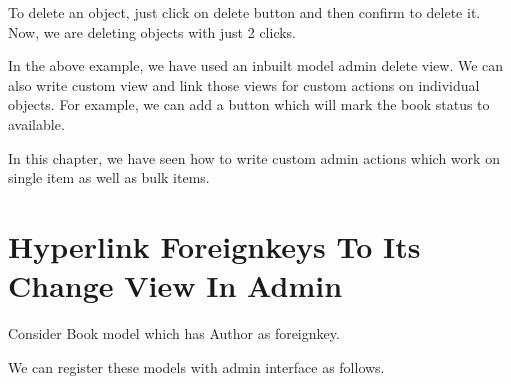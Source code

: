 \documentclass[letterpaper,12pt,english]{sphinxmanual}
\begin{document}
To delete an object, just click on delete button and then confirm to delete it. Now, we are deleting objects with just 2 clicks.

In the above example, we have used an inbuilt model admin delete view. We can also write custom view and link those views for custom actions on individual objects. For example, we can add a button which will mark the book status to available.

In this chapter, we have seen how to write custom admin actions which work on single item as well as bulk items.


\chapter{Hyperlink Foreignkeys To Its Change View In Admin}
\label{\detokenize{admin_hyperlink_foreignkey:hyperlink-foreignkeys-to-its-change-view-in-admin}}\label{\detokenize{admin_hyperlink_foreignkey::doc}}
Consider Book model which has Author as foreignkey.

\begin{sphinxVerbatim}[commandchars=\\\{\}]
   


 
      

 
      
      
\end{sphinxVerbatim}

We can register these models with admin interface as follows.

\begin{sphinxVerbatim}[commandchars=\\\{\}]
   

    

 
        

 
\end{sphinxVerbatim}
\end{document}
